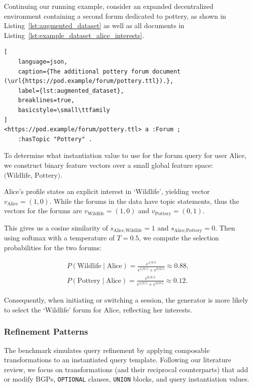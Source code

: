 Continuing our running example, consider an expanded decentralized environment containing a
second forum dedicated to pottery, as shown in
Listing~\ref{lst:augmented_dataset} as well as all documents in Listing~\ref{lst:example_dataset_alice_interests}.

\begin{lstlisting}[
    language=json,
    caption={The additional pottery forum document (\url{https://pod.example/forum/pottery.ttl}).},
    label={lst:augmented_dataset},
    breaklines=true,
    basicstyle=\small\ttfamily
]
<https://pod.example/forum/pottery.ttl> a :Forum ;
    :hasTopic "Pottery" .
\end{lstlisting}

To determine what instantiation value to use for the forum query for user Alice, we construct 
binary feature vectors over a small global feature space: 
$\text{(Wildlife, Pottery)}$. 

Alice's profile states an explicit interest in `Wildlife', yielding vector 
$v_{\text{Alice}} = (1, 0)$. While the forums in the data have topic statements, thus
the vectors for the forums are $v_{\text{Wildlife}} = (1, 0)$ and
$v_{\text{Pottery}} = (0, 1)$. 

This gives us a cosine similarity of $s_{\text{Alice},\text{Wildlife}} = 1$ and
$s_{\text{Alice},\text{Pottery}} = 0$. Then using softmax with a temperature of $T = 0.5$,
we compute the selection probabilities for the two forums:

\begin{align*}
    P(\text{Wildlife} \mid \text{Alice}) = \frac{e^{1 / 0.5}}{e^{1 / 0.5} + e^{0 / 0.5}} \approx 0.88, \\
    P(\text{Pottery} \mid \text{Alice}) = \frac{e^{0 / 0.5}}{e^{1 / 0.5} + e^{0 / 0.5}} \approx 0.12.
\end{align*}

Consequently, when initiating or switching a session, the generator is more likely to select the
`Wildlife' forum for Alice, reflecting her interests.

\subsubsection{Refinement Patterns}

The benchmark simulates query refinement by applying 
composable transformations to an instantiated query template. 
Following our literature review, we focus on transformations 
(and their reciprocal counterparts) that add or modify 
BGPs, \texttt{OPTIONAL} clauses, \texttt{UNION} blocks, 
and query instantiation values.

